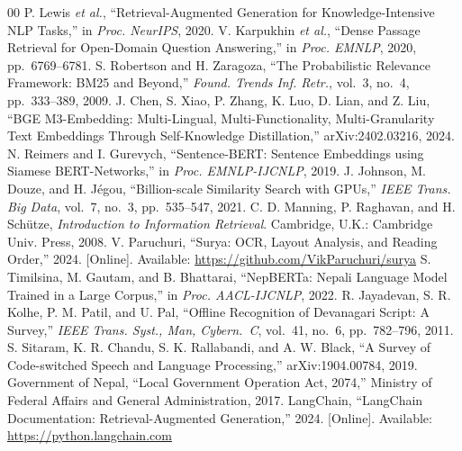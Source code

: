 \documentclass[conference]{IEEEtran}
\begin{document}
\begin{thebibliography}{00}
 P. Lewis \textit{et al.}, ``Retrieval-Augmented Generation for Knowledge-Intensive NLP Tasks,'' in \textit{Proc. NeurIPS}, 2020.
 V. Karpukhin \textit{et al.}, ``Dense Passage Retrieval for Open-Domain Question Answering,'' in \textit{Proc. EMNLP}, 2020, pp.\ 6769--6781.
 S. Robertson and H. Zaragoza, ``The Probabilistic Relevance Framework: BM25 and Beyond,'' \textit{Found. Trends Inf. Retr.}, vol.\ 3, no.\ 4, pp.\ 333--389, 2009.
 J. Chen, S. Xiao, P. Zhang, K. Luo, D. Lian, and Z. Liu, ``BGE M3-Embedding: Multi-Lingual, Multi-Functionality, Multi-Granularity Text Embeddings Through Self-Knowledge Distillation,'' arXiv:2402.03216, 2024.
 N. Reimers and I. Gurevych, ``Sentence-BERT: Sentence Embeddings using Siamese BERT-Networks,'' in \textit{Proc. EMNLP-IJCNLP}, 2019.
 J. Johnson, M. Douze, and H. J\'egou, ``Billion-scale Similarity Search with GPUs,'' \textit{IEEE Trans. Big Data}, vol.\ 7, no.\ 3, pp.\ 535--547, 2021.
 C. D. Manning, P. Raghavan, and H. Sch\"utze, \textit{Introduction to Information Retrieval}. Cambridge, U.K.: Cambridge Univ. Press, 2008.
 V. Paruchuri, ``Surya: OCR, Layout Analysis, and Reading Order,'' 2024. [Online]. Available: \url{https://github.com/VikParuchuri/surya}
 S. Timilsina, M. Gautam, and B. Bhattarai, ``NepBERTa: Nepali Language Model Trained in a Large Corpus,'' in \textit{Proc. AACL-IJCNLP}, 2022.
 R. Jayadevan, S. R. Kolhe, P. M. Patil, and U. Pal, ``Offline Recognition of Devanagari Script: A Survey,'' \textit{IEEE Trans. Syst., Man, Cybern.\ C}, vol.\ 41, no.\ 6, pp.\ 782--796, 2011.
 S. Sitaram, K. R. Chandu, S. K. Rallabandi, and A. W. Black, ``A Survey of Code-switched Speech and Language Processing,'' arXiv:1904.00784, 2019.
 Government of Nepal, ``Local Government Operation Act, 2074,'' Ministry of Federal Affairs and General Administration, 2017.
 LangChain, ``LangChain Documentation: Retrieval-Augmented Generation,'' 2024. [Online]. Available: \url{https://python.langchain.com}
\end{thebibliography}
\end{document}
